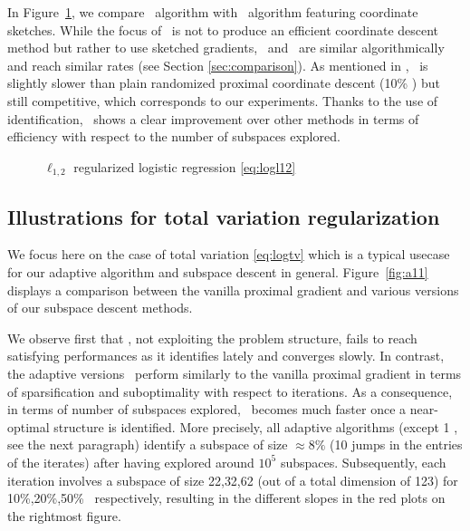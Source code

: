 In Figure~\ref{fig:rcv1_l12}, we compare \adaalgo~algorithm with \sega~algorithm featuring coordinate sketches\;\cite{hanzely2018sega}. While the focus of \sega~is not to produce an efficient coordinate descent method but rather to use sketched gradients, \sega~and \algo~are similar algorithmically and reach similar rates (see Section \ref{sec:comparison}). As mentioned in \cite[Apx.\;G2]{hanzely2018sega}, \sega~is slightly slower than plain randomized proximal coordinate descent (10\% \algo) but still competitive, which corresponds to our experiments. Thanks to the use of identification, \adaalgo~shows a clear improvement over other methods in terms of efficiency with respect to the number of subspaces explored.

\begin{figure}[H]
\begin{center}
\scalebox{.85}{}
\scalebox{.85}{}
\scalebox{.85}{}
\end{center}
\caption{$\ell_{1,2}$ regularized logistic regression \eqref{eq:logl12}
}
\label{fig:rcv1_l12}
\end{figure}

\subsection{Illustrations for total variation regularization}

We focus here on the case of total variation \eqref{eq:logtv} which is a typical usecase for our adaptive algorithm and subspace descent in general. Figure~\ref{fig:a11} displays a comparison between the vanilla proximal gradient and various versions of our subspace descent methods.

We observe first that  \algo, not exploiting the problem structure, fails to reach satisfying performances as it identifies lately and converges slowly. In contrast, the adaptive versions \adaalgo~perform similarly to the vanilla proximal gradient in terms of sparsification and suboptimality with respect to iterations. As a consequence, in terms of number of subspaces explored, \adaalgo~becomes much faster once a near-optimal structure is identified. More precisely, all adaptive algorithms (except 1 \adaalgo, see the next paragraph) identify a subspace of size $\approx 8\%$ (10 jumps in the entries of the iterates) after having explored around $10^5$ subspaces. Subsequently, each iteration involves a subspace of size 22,32,62 (out of a total dimension of 123) for 10\%,20\%,50\% \adaalgo~respectively, resulting in the different slopes in the red plots on the rightmost figure.

